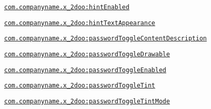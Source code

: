 {\tt \hyperlink{classandroid_1_1support_1_1v4_1_1_r_1_1styleable_a55fe41974b69e81336cb0c2750c45fd}{com.companyname.x\_\-2doo:hintEnabled}}

{\tt \hyperlink{classandroid_1_1support_1_1v4_1_1_r_1_1styleable_c535b56b26e64b26c7f84158fc06f41a}{com.companyname.x\_\-2doo:hintTextAppearance}}

{\tt \hyperlink{classandroid_1_1support_1_1v4_1_1_r_1_1styleable_bf936cf60adff593b4d8f71e2914568b}{com.companyname.x\_\-2doo:passwordToggleContentDescription}}

{\tt \hyperlink{classandroid_1_1support_1_1v4_1_1_r_1_1styleable_868c1aeee5f74a15faca475df88aafc1}{com.companyname.x\_\-2doo:passwordToggleDrawable}}

{\tt \hyperlink{classandroid_1_1support_1_1v4_1_1_r_1_1styleable_42d6b9f952af765e6e832381e786bcd8}{com.companyname.x\_\-2doo:passwordToggleEnabled}}

{\tt \hyperlink{classandroid_1_1support_1_1v4_1_1_r_1_1styleable_b9b1edb6651d08b5764eaf9bb8fb1d98}{com.companyname.x\_\-2doo:passwordToggleTint}}

{\tt \hyperlink{classandroid_1_1support_1_1v4_1_1_r_1_1styleable_d9463181356179330f3502a4a7936e5a}{com.companyname.x\_\-2doo:passwordToggleTintMode}}

